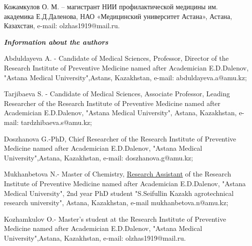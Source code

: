 Кожамкулов О. М. -- магистрант НИИ профилактической медицины им.
академика Е.Д.Даленова, НАО «Медицинский университет Астана», Астана,
Казахстан, e-mail:
olzhas1919@mail.ru.

\emph{{\bfseries Information about the authors}}

Abduldayeva A. - Candidate of Medical Sciences, Professor, Director of
the Research Institute of Preventive Medicine named after Academician
E.D.Dalenov, "Astana Medical University",Astans, Kazakhstan, e-mail:
abduldayeva.a@amu.kz;

Tarjibaeva S. - Candidate of Medical Sciences, Associate Professor,
Leading Researcher of the Research Institute of Preventive Medicine
named after Academician E.D.Dalenov, "Astana Medical University",
Astana, Kazakhstan, e-mail:
tardzhibaeva.s@amu.kz;

Doszhanova G.-PhD, Chief Researcher of the Research Institute of
Preventive Medicine named after Academician E.D.Dalenov, "Astana Medical
University",Astana, Kazakhstan, e-mail: doszhanova.g@amu.kz;

Mukhanbetova N.- Master of Chemistry,
\href{https://context.reverso.net/\%D0\%BF\%D0\%B5\%D1\%80\%D0\%B5\%D0\%B2\%D0\%BE\%D0\%B4/\%D0\%B0\%D0\%BD\%D0\%B3\%D0\%BB\%D0\%B8\%D0\%B9\%D1\%81\%D0\%BA\%D0\%B8\%D0\%B9-\%D1\%80\%D1\%83\%D1\%81\%D1\%81\%D0\%BA\%D0\%B8\%D0\%B9/research+assistant}{Research
Assistant} of the Research Institute of Preventive Medicine named after
Academician E.D.Dalenov, "Astana Medical University", 2nd year PhD
student "S.Seifullin Kazakh agrotechnical research university", Astana,
Kazakhstan, e-mail
mukhanbetova.n@amu.kz;

Kozhamkulov O.- Master's student at the Research Institute of Preventive
Medicine named after Academician E.D.Dalenov, "Astana Medical
University",Astana, Kazakhstan, e-mail:
olzhas1919@mail.ru.